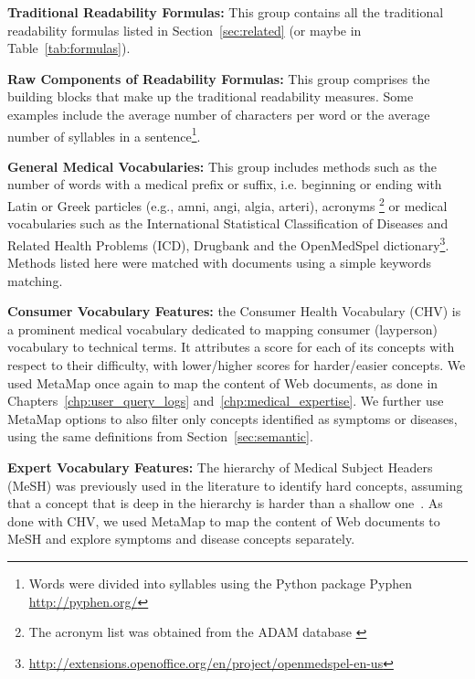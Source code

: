 
\textbf{Traditional Readability Formulas:}
This group contains all the traditional readability formulas listed in Section~\ref{sec:related} (or maybe  in Table~\ref{tab:formulas}).

\textbf{Raw Components of Readability Formulas:}
This group comprises the building blocks that make up the traditional readability measures. Some examples include the average number of characters per word or the average number of syllables in a sentence\footnote{Words were divided into syllables using the Python package Pyphen \url{http://pyphen.org/}}.

\textbf{General Medical Vocabularies:}
This group includes methods such as the number of words with a medical prefix or suffix, i.e. beginning or ending with Latin or Greek particles (e.g., amni, angi, algia, arteri), acronyms \footnote{The acronym list was obtained from the ADAM database \cite{zhou2006}} or medical vocabularies such as the International Statistical Classification of Diseases and Related Health Problems (ICD), Drugbank and the OpenMedSpel dictionary\footnote{\url{http://extensions.openoffice.org/en/project/openmedspel-en-us}}. 
Methods listed here were matched with documents using a simple keywords matching.

\textbf{Consumer Vocabulary Features:}
the Consumer Health Vocabulary (CHV) is a prominent medical vocabulary dedicated to mapping consumer (layperson) vocabulary to technical terms. 
It attributes a score for each of its concepts with respect to their difficulty, with lower/higher scores for harder/easier concepts.
We used MetaMap once again to map the content of Web documents, as done in Chapters~\ref{chp:user_query_logs} and~\ref{chp:medical_expertise}. 
We further use MetaMap options to also filter only concepts identified as symptoms or diseases, using the same definitions from Section~\ref{sec:semantic}. 

\textbf{Expert Vocabulary Features:}
The hierarchy of Medical Subject Headers (MeSH) was previously used in the literature to identify hard concepts, assuming that a concept that is deep in the hierarchy is harder than a shallow one~\cite{yan11}.
As done with CHV, we used MetaMap to map the content of Web documents to MeSH and explore symptoms and disease concepts separately.


